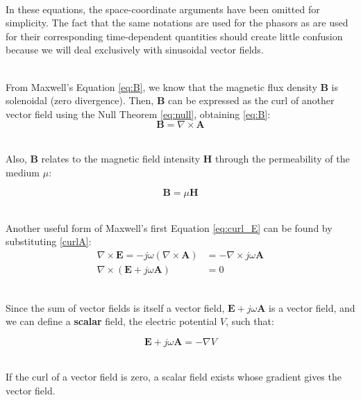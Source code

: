 \documentclass[main]{subfiles}
\begin{document}
\noindent\\
In these equations, the space-coordinate arguments 
have been omitted for simplicity. The fact that 
the same notations are used for the phasors as 
are used for their corresponding time-dependent 
quantities should create little confusion because 
we will deal exclusively with sinusoidal vector 
fields.

\noindent\\
From Maxwell's Equation \eqref{eq:B}, we know that 
the magnetic flux density \(\mathbf{B}\) is solenoidal 
(zero divergence). Then, \(\mathbf{B}\) can be expressed 
as the curl of another vector field using the 
Null Theorem \eqref{eq:null}, obtaining \ref{eq:B}:
\begin{equation}
 \mathbf{B} = \nabla \times \mathbf{A}
    \label{curlA}
\end{equation}

\noindent\\
Also, \(\mathbf{B}\) relates to the magnetic field 
intensity \(\mathbf{H}\) through the permeability of 
the medium \(\mu\):

\begin{equation}
 \mathbf{B} = \mu \mathbf{H}
    \label{eq:BH}
\end{equation}

\noindent\\
Another useful form of Maxwell's first Equation 
\eqref{eq:curl_E} can be found by substituting 
\ref{curlA}:
\begin{align}
    \nabla \times \mathbf{E} = - j \omega 
 (\nabla \times \mathbf{A}) &= -\nabla \times 
 j \omega \mathbf{A} \nonumber \\
    \nabla \times \left(\mathbf{E} + 
 j \omega \mathbf{A}\right) &= 0 \nonumber
\end{align}

\noindent\\
Since the sum of vector fields is itself a vector 
field, \(\mathbf{E} + j \omega \mathbf{A}\) is a 
vector field, and we can define a \textbf{scalar} 
field, the electric potential \(V\), such that:

\begin{equation}
 \mathbf{E} + j \omega \mathbf{A} = -\nabla V
    \label{eq:V}
\end{equation}

\noindent\\
If the curl of a vector field is zero, a scalar 
field exists whose gradient gives the vector field.
\end{document}
